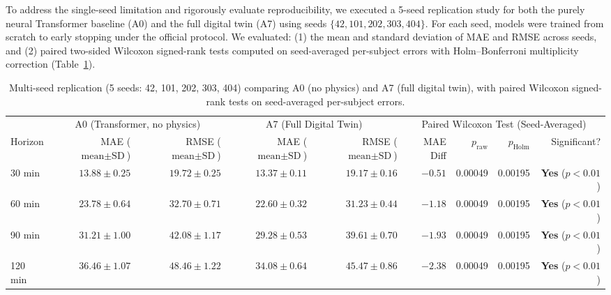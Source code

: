 \documentclass[journal]{IEEEtran}
\begin{document}
To address the single-seed limitation and rigorously evaluate reproducibility, we executed a 5-seed replication study for both the purely neural Transformer baseline (A0) and the full digital twin (A7) using seeds $\{42, 101, 202, 303, 404\}$. For each seed, models were trained from scratch to early stopping under the official protocol. We evaluated: (1) the mean and standard deviation of MAE and RMSE across seeds, and (2) paired two-sided Wilcoxon signed-rank tests computed on seed-averaged per-subject errors with Holm--Bonferroni multiplicity correction (Table~\ref{tab:multiseed}).

\begin{table}[t]
\centering
\caption{Multi-seed replication (5 seeds: 42, 101, 202, 303, 404) comparing A0 (no physics) and A7 (full digital twin), with paired Wilcoxon signed-rank tests on seed-averaged per-subject errors.}
\label{tab:multiseed}
\footnotesize
\setlength{\tabcolsep}{4.5pt}
\begin{tabular}{lrrrrrrrr}
\toprule
& \multicolumn{2}{c}{A0 (Transformer, no physics)} & \multicolumn{2}{c}{A7 (Full Digital Twin)} & \multicolumn{4}{c}{Paired Wilcoxon Test (Seed-Averaged)} \\
\cmidrule(lr){2-3} \cmidrule(lr){4-5} \cmidrule(lr){6-9}
Horizon & MAE ($\text{mean}\pm\text{SD}$) & RMSE ($\text{mean}\pm\text{SD}$) & MAE ($\text{mean}\pm\text{SD}$) & RMSE ($\text{mean}\pm\text{SD}$) & MAE Diff & $p_{\text{raw}}$ & $p_{\text{Holm}}$ & Significant? \\
\midrule
30 min & $13.88 \pm 0.25$ & $19.72 \pm 0.25$ & $\mathbf{13.37 \pm 0.11}$ & $\mathbf{19.17 \pm 0.16}$ & $-0.51$ & 0.00049 & 0.00195 & \textbf{Yes} ($p < 0.01$) \\
60 min & $23.78 \pm 0.64$ & $32.70 \pm 0.71$ & $\mathbf{22.60 \pm 0.32}$ & $\mathbf{31.23 \pm 0.44}$ & $-1.18$ & 0.00049 & 0.00195 & \textbf{Yes} ($p < 0.01$) \\
90 min & $31.21 \pm 1.00$ & $42.08 \pm 1.17$ & $\mathbf{29.28 \pm 0.53}$ & $\mathbf{39.61 \pm 0.70}$ & $-1.93$ & 0.00049 & 0.00195 & \textbf{Yes} ($p < 0.01$) \\
120 min & $36.46 \pm 1.07$ & $48.46 \pm 1.22$ & $\mathbf{34.08 \pm 0.64}$ & $\mathbf{45.47 \pm 0.86}$ & $-2.38$ & 0.00049 & 0.00195 & \textbf{Yes} ($p < 0.01$) \\
\bottomrule
\end{tabular}
\end{table}
\end{document}
